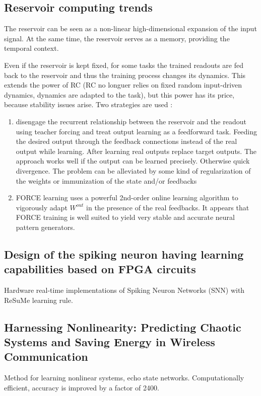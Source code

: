 \documentclass[12pt]{article}
\begin{document}
\subsection{Reservoir computing trends \cite{lukovsevivcius2012reservoir}}

The reservoir can be seen as a non-linear high-dimensional expansion of the input signal. At the same time, the reservoir serves as a memory, providing the temporal context.

Even if the reservoir is kept fixed, for some tasks the trained readouts are fed back to the reservoir and thus the training process changes its dynamics. This extends the power of RC (RC no longuer relies on fixed random input-driven dynamics, dynamics are adapted to the task), but this power has its price, because stability issues arise. Two strategies are used : \begin{enumerate}
\item disengage the recurrent relationship between the reservoir and the readout using teacher forcing and treat output learning as a feedforward task. Feeding the desired output through the feedback connections instead of the real output while learning. After learning real outputs replace target outputs. The approach works well if the output can be learned precisely. Otherwise quick divergence. The problem can be alleviated by some kind of regularization of the weights or immunization of the state and/or feedbacks
\item FORCE learning uses a powerful 2nd-order online learning algorithm to vigorously adapt $W^{out}$ in the presence of the real feedbacks. It appears that FORCE training is well suited to yield very stable and accurate neural pattern generators.
\end{enumerate}
\subsection{Design of the spiking neuron having learning capabilities based on FPGA circuits \cite{kraft2006design}}
Hardware real-time implementations of Spiking Neuron Networks (SNN) with ReSuMe learning rule.

\subsection{Harnessing Nonlinearity: Predicting Chaotic Systems and Saving Energy in Wireless Communication \cite{jaeger2004harnessing}}

Method for learning nonlinear systems, echo state networks. Computationally efficient, accuracy is improved by a factor of 2400.
\end{document}
